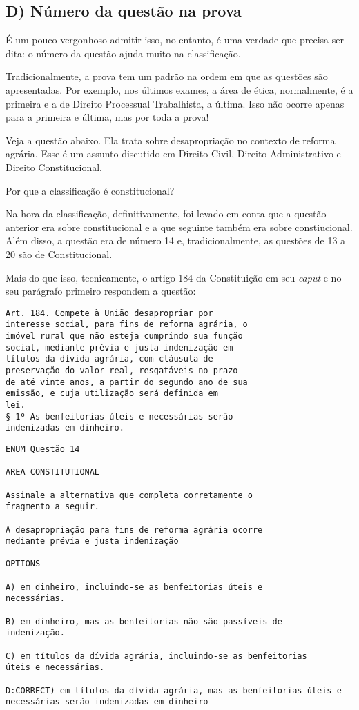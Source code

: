 \documentclass{article}
\begin{document}
\subsection*{D) Número da questão na prova}

É um pouco vergonhoso admitir isso, no entanto, é uma verdade que precisa ser dita: o número da questão ajuda muito na classificação. 

Tradicionalmente, a prova tem um padrão na ordem em que as questões são apresentadas. Por exemplo, nos últimos exames, a área de ética, normalmente, é a primeira e a de Direito Processual Trabalhista, a última. Isso não ocorre apenas para a primeira e última, mas por toda a prova!

Veja a questão abaixo. Ela trata sobre desapropriação no contexto de  reforma agrária. Esse é um assunto discutido em Direito Civil, Direito Administrativo e Direito Constitucional.

Por que a classificação é constitucional?

Na hora da classificação, definitivamente, foi levado em conta que a questão anterior era sobre constitucional e a que seguinte também era sobre constiucional. Além disso, a questão era de número 14 e, tradicionalmente, as questões de 13 a 20 são de Constitucional.

Mais do que isso, tecnicamente, o artigo 184 da Constituição em seu \textit{caput} e no seu parágrafo primeiro respondem a questão:

\begin{verbatim}
Art. 184. Compete à União desapropriar por
interesse social, para fins de reforma agrária, o
imóvel rural que não esteja cumprindo sua função
social, mediante prévia e justa indenização em
títulos da dívida agrária, com cláusula de
preservação do valor real, resgatáveis no prazo
de até vinte anos, a partir do segundo ano de sua
emissão, e cuja utilização será definida em
lei.
§ 1º As benfeitorias úteis e necessárias serão
indenizadas em dinheiro.
\end{verbatim}


\begin{verbatim}
ENUM Questão 14 
  
AREA CONSTITUTIONAL
  
Assinale a alternativa que completa corretamente o 
fragmento a seguir. 

A desapropriação para fins de reforma agrária ocorre 
mediante prévia e justa indenização  

OPTIONS 

A) em dinheiro, incluindo-se as benfeitorias úteis e 
necessárias. 

B) em dinheiro, mas as benfeitorias não são passíveis de 
indenização. 

C) em títulos da dívida agrária, incluindo-se as benfeitorias 
úteis e necessárias. 

D:CORRECT) em títulos da dívida agrária, mas as benfeitorias úteis e 
necessárias serão indenizadas em dinheiro
\end{verbatim}
\end{document}
